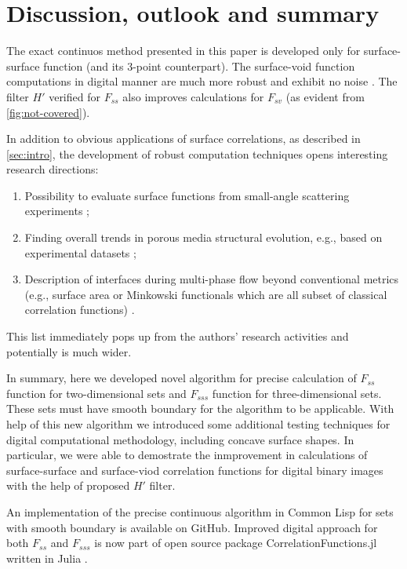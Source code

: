 \documentclass[reprint,amsmath,amssymb,aps,pre,showkeys,showpacs]{revtex4-1}
\begin{document}
\section{Discussion, outlook and summary}
\label{sec:summary}
The exact continuos method presented in this paper is developed only for
surface-surface function (and its 3-point counterpart). The surface-void
function computations in digital manner are much more robust and exhibit no
noise \cite{ma2018SS,Samarin}. The filter $H'$ verified for $F_{ss}$ also
improves calculations for $F_{sv}$ (as evident from \cref{fig:not-covered}).

In addition to obvious applications of surface correlations, as described in
\cref{sec:intro}, the development of robust computation techniques opens
interesting research directions:
\begin{enumerate}
    \item Possibility to evaluate surface functions from small-angle scattering
      experiments \cite{theor_paper};
    \item Finding overall trends in porous media structural evolution, e.g.,
      based on experimental datasets \cite{Jose,Fomin,nano_structure};
    \item Description of interfaces during multi-phase flow beyond conventional
      metrics (e.g., surface area or Minkowski functionals which are all subset
      of classical correlation functions) \cite{Hassanizadeh,Armstrong}.
\end{enumerate}
This list immediately pops up from the authors' research activities and
potentially is much wider.

In summary, here we developed novel algorithm for precise calculation of
$F_{ss}$ function for two-dimensional sets and $F_{sss}$ function for
three-dimensional sets. These sets must have smooth boundary for the algorithm
to be applicable. With help of this new algorithm we introduced some additional
testing techniques for digital computational methodology, including concave
surface shapes.  In particular, we were able to demostrate the inmprovement in
calculations of surface-surface and surface-viod correlation functions for
digital binary images with the help of proposed $H'$ filter.

An implementation of the precise continuous algorithm in Common Lisp for sets
with smooth boundary is available on GitHub\cite{diff-boundary-corrfn}. Improved
digital approach for both $F_{ss}$ and $F_{sss}$ is now part of open source
package CorrelationFunctions.jl written in Julia \cite{CFs.jl}.


\end{document}
